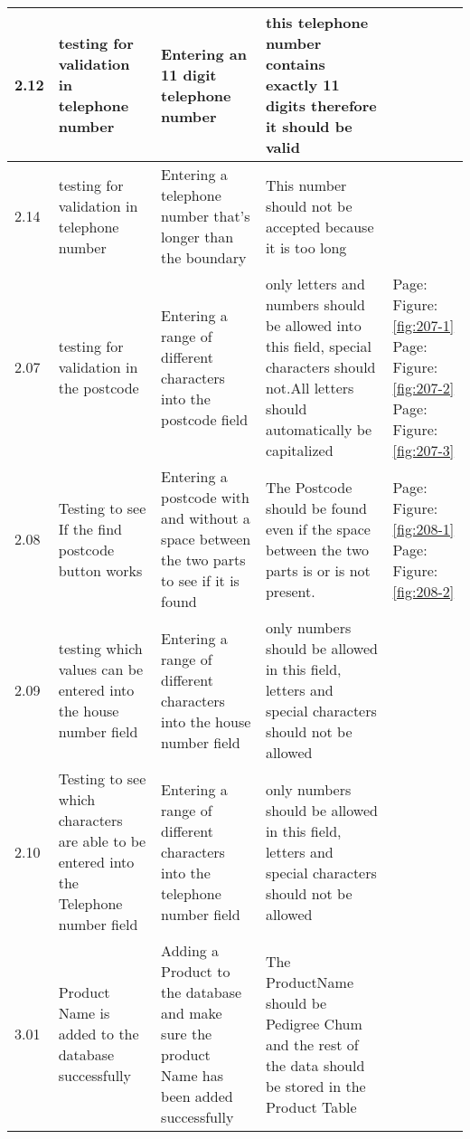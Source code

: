 \begin{flushleft}
\begin{longtable}{|p{1cm}|p{2.5cm}|p{2.5cm}|p{2cm}|p{2cm}|}
	\rowcolor{dark-grey}2.12 & testing for validation in telephone number & Entering an 11 digit telephone number & this telephone number contains exactly 11 digits therefore it should be valid &  \\ \hline
	\rowcolor{dark-grey}2.14 & testing for validation in telephone number & Entering a telephone number that's longer than the boundary & This number should not be accepted because it is too long & \\ \hline
	\rowcolor{light-grey}2.07 & testing for validation in the postcode & Entering a range of different characters into the postcode field & only letters and numbers should be allowed into this field, special characters should not.All letters should automatically be capitalized&  Page:\pageref{fig:207-1}  \newline Figure:\ref{fig:207-1} \newline  \newline  Page:\pageref{fig:207-2}  \newline Figure:\ref{fig:207-2}  \newline  \newline Page:\pageref{fig:207-3}  \newline Figure:\ref{fig:207-3}  \\ \hline
	\rowcolor{light-grey}2.08 & Testing to see If the find postcode button works & Entering a postcode with and without a space between the two parts to see if it is found &The Postcode should be found even if the space between the two parts is or is not present.& Page:\pageref{fig:208-1}  \newline Figure:\ref{fig:208-1} \newline \newline Page:\pageref{fig:208-2}  \newline Figure:\ref{fig:208-2} \\ \hline
	\rowcolor{light-grey}2.09 & testing which values can be entered into the house number field & Entering a range of different characters into the house number field & only numbers should be allowed in this field, letters and special characters should not be allowed &  \\ \hline
	\rowcolor{light-grey}2.10 & Testing to see which characters are able to be entered into the Telephone number field & Entering a range of different characters into the telephone number field & only numbers should be allowed in this field, letters and special characters should not be allowed & \\ \hline
	\rowcolor{dark-grey}3.01 & Product Name is added to the database successfully & Adding a Product to the database and make sure the product Name has been added successfully & The ProductName should be Pedigree Chum and the rest of the data should be stored in the Product Table & \\ \hline

\end{longtable}
\end{flushleft}

